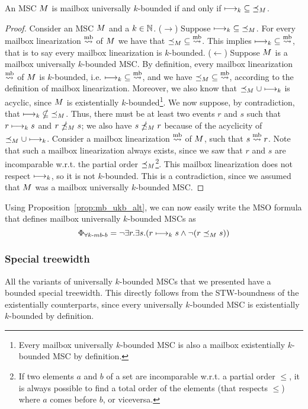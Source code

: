 \documentclass{article}
\begin{document}
\begin{proposition}\label{prop:mb_ukb_alt}
	An MSC $M$ is mailbox universally $k$-bounded if and only if $\longmapsto_k \;\subseteq\; \preceq_M$.
\end{proposition}
\begin{proof}
	Consider an MSC $M$ and a $k \in \mathbb{N}$.\newline
	($\rightarrow$) Suppose $\longmapsto_k \;\subseteq\; \preceq_M$. For every mailbox linearization $\overset{\text{mb}}{\rightsquigarrow}$ of $M$ we have that $\preceq_M \;\subseteq\; \overset{\text{mb}}{\rightsquigarrow}$. This implies $\longmapsto_k \;\subseteq\; \overset{\text{mb}}{\rightsquigarrow}$, that is to say every mailbox linearization is $k$-bounded.\newline
	($\leftarrow$) Suppose $M$ is a mailbox universally $k$-bounded MSC. By definition, every mailbox linearization $\overset{\text{mb}}{\rightsquigarrow}$ of $M$ is $k$-bounded, i.e. $\longmapsto_k \;\subseteq\; \overset{\text{mb}}{\rightsquigarrow}$, and we have $\preceq_M \;\subseteq\; \overset{\text{mb}}{\rightsquigarrow}$, according to the definition of mailbox linearization. Moreover, we also know that $\preceq_M \cup \longmapsto_k$ is acyclic, since $M$ is existentially $k$-bounded\footnote{Every mailbox universally $k$-bounded MSC is also a mailbox existentially $k$-bounded MSC by definition.}. We now suppose, by contradiction, that $\longmapsto_k \;\nsubseteq\; \preceq_M$. Thus, there must be at least two events $r$ and $s$ such that $r \longmapsto_k s$ and $r \npreceq_M s$; we also have $s \npreceq_M r$ because of the acyclicity of $\preceq_M \cup \longmapsto_k$. Consider a mailbox linearization $\overset{\text{mb}}{\rightsquigarrow}$  of $M$, such that $s \overset{\text{mb}}{\rightsquigarrow} r$. Note that such a mailbox linearization always exists, since we saw that $r$ and $s$ are incomparable w.r.t. the partial order $\preceq_M$\footnote{If two elements $a$ and $b$ of a set are incomparable w.r.t. a partial order $\le$, it is always possible to find a total order of the elements (that respects $\le$) where $a$ comes before $b$, or viceversa.}. This mailbox linearization does not respect $\longmapsto_k$, so it is not $k$-bounded. This is a contradiction, since we assumed that $M$ was a mailbox universally $k$-bounded MSC.
\end{proof}

Using Proposition~\ref{prop:mb_ukb_alt}, we can now easily write the MSO formula that defines mailbox universally $k$-bounded MSCs as
\[ \Phi_{\forall k\text{-}mb\text{-}b} = \neg \exists r.\exists s.(r \longmapsto_k s \wedge \neg(r \preceq_M s)) \]

\subsubsection{Special treewidth}

All the variants of universally $k$-bounded MSCs that we presented have a bounded special treewidth. This directly follows from the STW-boundness of the existentially counterparts, since every universally $k$-bounded MSC is existentially $k$-bounded by definition.

\printbibliography
\end{document}
